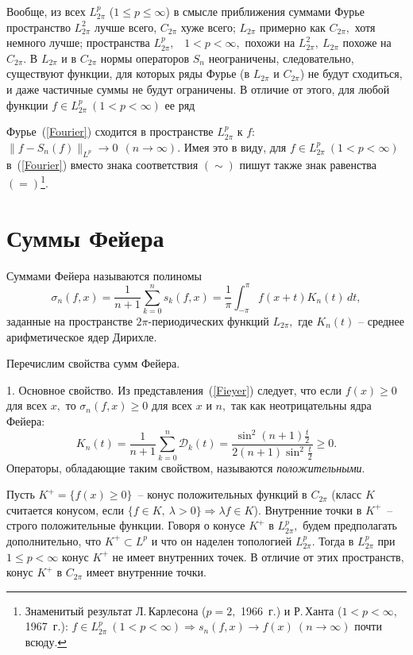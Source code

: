 Вообще, из всех {$L^p_{2\pi}$} ($1\le p\le \infty$) в смысле
приближения суммами Фурье пространство
{$L^2_{2\pi}$} лучше всего, $C_{2\pi}$ хуже
всего; {$L_{2\pi}$} примерно как $C_{2\pi},$ хотя немного лучше; {пространства $L^p_{2\pi},$~ $1< p< \infty, $}
похожи на {$L^2_{2\pi},
\ L_{2\pi}$} похоже на {$C_{2\pi}.$} В {$L_{2\pi}$} и в {$C_{2\pi}$}
нормы операторов {$S_n$} неограничены, следовательно,
существуют функции, для которых ряды Фурье (в {$L_{2\pi}$} и {$C_{2\pi}$})
не будут сходиться, и даже частичные суммы не будут ограничены.
{ В отличие от этого, для любой функции $f\in L^p_{2\pi}\ (1<p<\infty)$ ее ряд}
{Фурье~(\ref{Fourier}) сходится в пространстве
$L^p_{2\pi}$ к $f$: $\|f-S_n(f)\|_{L^p}\to0\ \ (n\to\infty).$ Имея это в виду,
для $f\in L^p_{2\pi}\ (1<p<\infty)$ в~(\ref{Fourier}) вместо знака
соответствия $(\sim)$ пишут также знак равенства $(=)$\footnote{Знаменитый результат
Л.\,Карлесона ($p=2,$ 1966~г.) и Р.\,Ханта ($1<p<\infty$, 1967~г.):
$f\in L_{2\pi}^p\ (1<p<\infty)\Rightarrow s_n(f,x)\to f(x)\ (n\to\infty)$ почти всюду.}.

\section{Суммы Фейера}\label{s5-2}

Суммами Фейера называются полиномы
\begin{equation}
\label{Fieyer}
\sigma_n(f,x)=\frac{1}{n+1} \sum\limits_{k=0}^{n} s_k(f,x)=\frac{1}{\pi}
\int_{-\pi}^{\pi} f(x+t) K_n(t)\,
dt,
\end{equation}
{заданные на пространстве $2\pi$-периодических функций} $L_{2\pi},$ где $K_n(t)$ -- среднее
арифметическое ядер Дирихле.

Перечислим свойства сумм Фейера.


1. Основное свойство. Из представления~(\ref{Fieyer})
следует, что если $f(x)\ge 0$ для всех $x,$ то $\sigma_n(f,x)\ge
0$ для всех $x$ и $n,$ так как неотрицательны ядра Фейера:
$$
K_n(t)=\frac{1}{n+1} \sum\limits_{k=0}^{n}
\mathcal D_k(t)=\frac{\sin^2(n+1)\frac{t}{2}}{2(n+1)\sin^2 \frac{t}{2}}\ge
0.
$$
Операторы,
обладающие таким свойством, называются \textit{положительными}.

Пусть $K^+=\{ f(x)\ge 0\}$~-- конус положительных функций в
$C_{2\pi}$ (класс $K$ считается конусом, если $\{ f\in K,\ \lambda>0\}
\Rightarrow \lambda f\in
K$).
Внутренние точки {в $K^+$}~-- строго положительные функции. {Говоря о конусе
$K^+$ в $L^p_{2\pi},$ будем предполагать дополнительно,}
{что $K^+\subset L^p$ и что он наделен топологией $L^p_{2\pi}.$
Тогда в $L^p_{2\pi}$ при} {$1\le p<\infty$} конус $K^+$ не
имеет внутренних точек. В отличие от этих пространств, конус
{$K^+$ в $C_{2\pi}$} имеет внутренние точки.

}
